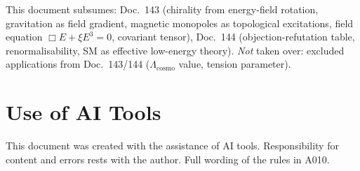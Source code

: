 This document subsumes: Doc.~143 (chirality from energy-field rotation, gravitation
as field gradient, magnetic monopoles as topological excitations, field equation
$\Box E+\xi E^3=0$, covariant tensor), Doc.~144 (objection-refutation table,
renormalisability, SM as effective low-energy theory). \emph{Not} taken over:
excluded applications from Doc.~143/144 ($\Lambda_\text{cosmo}$ value, tension
parameter).

\section{Use of AI Tools}

This document was created with the assistance of AI tools. Responsibility
for content and errors rests with the author. Full wording of the rules in A010.
